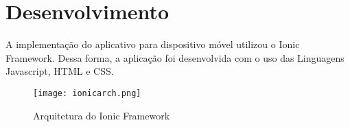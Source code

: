 \chapter{Desenvolvimento}
A implementação do aplicativo para dispositivo móvel utilizou o Ionic Framework. Dessa forma, a aplicação foi desenvolvida com o uso das Linguagens Javascript, HTML e CSS.

\begin{figure}[!htb]
  \centering
  \texttt{[image: ionicarch.png]} %
  \caption[Arquitetura do Ionic Framework]{Arquitetura do Ionic Framework}
  \label{fig:ionicarch}
\end{figure}